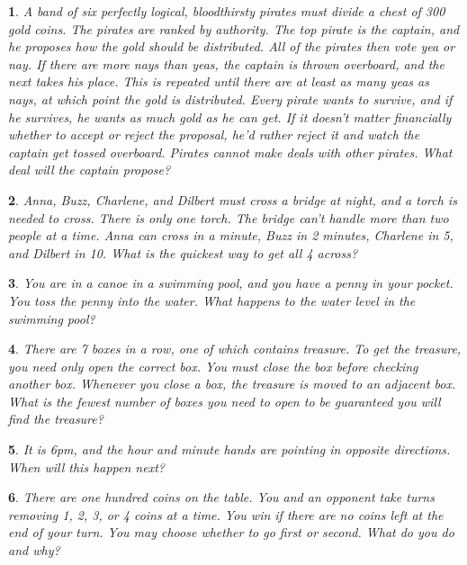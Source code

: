 \documentclass{report}
\newtheorem{problem}{}
\numberwithin{problem}{chapter} %
\begin{document}
\begin{problem}
A band of six perfectly logical, bloodthirsty pirates must divide a chest of 300 gold coins. The pirates are ranked by authority. The top pirate is the captain, and he proposes how the gold should be distributed. All of the pirates then vote yea or nay. If there are more nays than yeas, the captain is thrown overboard, and the next takes his place. This is repeated until there are at least as many yeas as nays, at which point the gold is distributed. Every pirate wants to survive, and if he survives, he wants as much gold as he can get. If it doesn't matter financially whether to accept or reject the proposal, he'd rather reject it and watch the captain get tossed overboard. Pirates cannot make deals with other pirates. What deal will the captain propose?
\end{problem}

\begin{problem}
Anna, Buzz, Charlene, and Dilbert must cross a bridge at night, and a torch is needed to cross. There is only one torch. The bridge can't handle more than two people at a time. Anna can cross in a minute, Buzz in 2 minutes, Charlene in 5, and Dilbert in 10. What is the quickest way to get all 4 across?
\end{problem}

\begin{problem}
You are in a canoe in a swimming pool, and you have a penny in your pocket. You toss the penny into the water. What happens to the water level in the swimming pool?
\end{problem}

\begin{problem}
There are 7 boxes in a row, one of which contains treasure. To get the treasure, you need only open the correct box. You must close the box before checking another box. Whenever you close a box, the treasure is moved to an adjacent box. What is the fewest number of boxes you need to open to be guaranteed you will find the treasure?
\end{problem}

\begin{problem}
It is 6pm, and the hour and minute hands are pointing in opposite directions. When will this happen next?
\end{problem}

\begin{problem}
There are one hundred coins on the table. You and an opponent take turns removing 1, 2, 3, or 4 coins at a time. You win if there are no coins left at the end of your turn. You may choose whether to go first or second. What do you do and why?
\end{problem}
\end{document}
